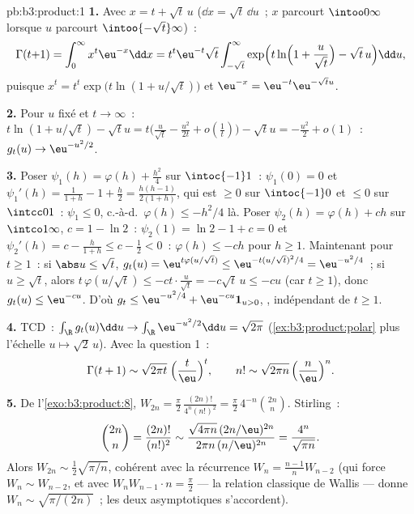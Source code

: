 \begin{solution}{pb:b3:product:1}
\textbf{1.} Avec $x = t + \sqrt t\,u$ ($\dd x = \sqrt
t\,\dd u$~; $x$ parcourt $\intoo0\infty$ lorsque $u$ parcourt
$\intoo{-\sqrt t}\infty$)~:
\[
\Gamma(t{+}1) = \int_0^\infty x^t\eu^{-x}\dd x
= t^t\eu^{-t}\sqrt t\int_{-\sqrt t}^{\infty}
\exp\Bigl(t\ln\Bigl(1 + \frac u{\sqrt t}\Bigr) - \sqrt
t\,u\Bigr)\dd u,
\]
puisque $x^t = t^t\exp\bigl(t\ln(1 + u/\sqrt t)\bigr)$ et
$\eu^{-x} = \eu^{-t}\eu^{-\sqrt tu}$.

\textbf{2.} Pour $u$ fixé et $t \to \infty$~: $t\ln(1 +
u/\sqrt t) - \sqrt tu = t\bigl(\frac u{\sqrt t} -
\frac{u^2}{2t} + o(\frac1t)\bigr) - \sqrt tu = -\frac{u^2}2 +
o(1)$~: $g_t(u) \to \eu^{-u^2/2}$.

\textbf{3.} Poser $\psi_1(h) = \varphi(h) + \frac{h^2}4$ sur
$\intoc{-1}1$~: $\psi_1(0) = 0$ et $\psi_1'(h) = \frac1{1+h}
- 1 + \frac h2 = \frac{h(h-1)}{2(1+h)}$, qui est $\geq 0$ sur
$\intoc{-1}0$ et $\leq 0$ sur $\intcc01$~: $\psi_1 \leq 0$,
c.-à-d.\ $\varphi(h) \leq -h^2/4$ là. Poser $\psi_2(h) =
\varphi(h) + ch$ sur $\intco1\infty$, $c = 1 - \ln2$~:
$\psi_2(1) = \ln2 - 1 + c = 0$ et $\psi_2'(h) = c -
\frac h{1+h} \leq c - \frac12 < 0$~: $\varphi(h) \leq -ch$
pour $h \geq 1$. Maintenant pour $t \geq 1$~: si $\abs u \leq
\sqrt t$, $g_t(u) = \eu^{t\varphi(u/\sqrt t)} \leq
\eu^{-t(u/\sqrt t)^2/4} = \eu^{-u^2/4}$~; si $u \geq \sqrt
t$, alors $t\,\varphi(u/\sqrt t) \leq -ct\cdot\frac u{\sqrt
t} = -c\sqrt t\,u \leq -cu$ (car $t \geq 1$), donc $g_t(u)
\leq \eu^{-cu}$. D'où $g_t \leq \eu^{-u^2/4} +
\eu^{-cu}\mathbf 1_{u>0}$, , indépendant de $t
\geq 1$.

\textbf{4.} TCD~: $\int_\R g_t(u)\dd u \to
\int_\R\eu^{-u^2/2}\dd u = \sqrt{2\pi}$
(\cref{ex:b3:product:polar} plus l'échelle
$u\mapsto\sqrt2\,u$). Avec la question 1~:
\[
\Gamma(t + 1) \sim \sqrt{2\pi t}\;\Bigl(\frac
t\eu\Bigr)^t,\qquad
n! \sim \sqrt{2\pi n}\,\Bigl(\frac n\eu\Bigr)^n .
\]

\textbf{5.} De l'\cref{exo:b3:product:8}, $W_{2n} =
\frac\pi2\,\frac{(2n)!}{4^n(n!)^2} =
\frac\pi2\,4^{-n}\binom{2n}n$. Stirling~:
\[
\binom{2n}{n} = \frac{(2n)!}{(n!)^2}
\sim \frac{\sqrt{4\pi n}\,(2n/\eu)^{2n}}
{2\pi n\,(n/\eu)^{2n}} = \frac{4^n}{\sqrt{\pi n}} .
\]
Alors $W_{2n} \sim \frac12\sqrt{\pi/n}$, cohérent avec la
récurrence $W_n = \frac{n-1}nW_{n-2}$ (qui force $W_n \sim
W_{n-2}$, et avec $W_nW_{n-1}\cdot n = \frac\pi2$ --- la
relation classique de Wallis --- donne $W_n \sim
\sqrt{\pi/(2n)}$~; les deux asymptotiques s'accordent).


\end{solution}
